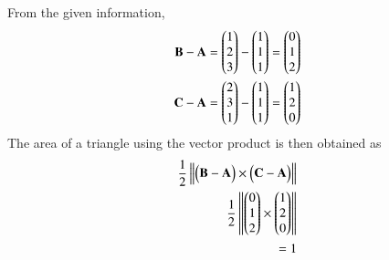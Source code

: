 From the given information, 
%
\begin{align}
    \vec{B-A}=\myvec{1\\2\\3}-\myvec{1\\1\\1} = \myvec{0\\1\\2}\\
    \vec{C-A}=\myvec{2\\3\\1}-\myvec{1\\1\\1}=\myvec{1\\2\\0}\\
    \end{align}
The area of a triangle using the vector product is then obtained as
\begin{align}
    \frac{1}{2}\norm{\myvec{\vec{B-A}}\times\myvec{\vec{C-A}}}\\ \frac{1}{2}\norm{\myvec{0\\1\\2}\times \myvec{1\\2\\0}}\\=1
    \end{align}